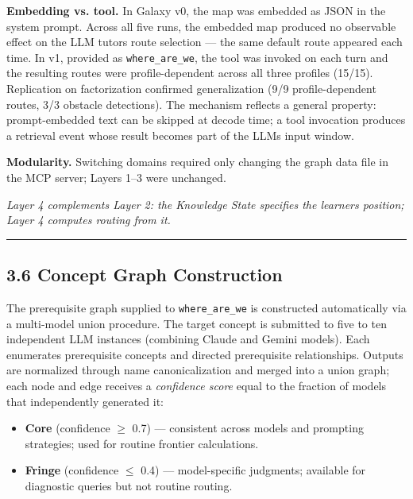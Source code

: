\documentclass[
]{article}
\providecommand{\tightlist}{%
  \setlength{\itemsep}{0pt}\setlength{\parskip}{0pt}}
\begin{document}
\textbf{Embedding vs. tool.} In Galaxy v0, the map was embedded as JSON in the system prompt. Across all five runs, the embedded map produced no observable effect on the LLM tutor\textquotesingle s route selection --- the same default route appeared each time. In v1, provided as \texttt{where\_are\_we}, the tool was invoked on each turn and the resulting routes were profile-dependent across all three profiles (15/15). Replication on factorization confirmed generalization (9/9 profile-dependent routes, 3/3 obstacle detections). The mechanism reflects a general property: prompt-embedded text can be skipped at decode time; a tool invocation produces a retrieval event whose result becomes part of the LLM\textquotesingle s input window.

\textbf{Modularity.} Switching domains required only changing the graph data file in the MCP server; Layers 1--3 were unchanged.

\emph{Layer 4 complements Layer 2: the Knowledge State specifies the learner\textquotesingle s position; Layer 4 computes routing from it.}

\begin{center}\rule{0.5\linewidth}{0.5pt}\end{center}

\subsection{3.6 Concept Graph Construction}\label{36-concept-graph-construction}

The prerequisite graph supplied to \texttt{where\_are\_we} is constructed automatically via a multi-model union procedure. The target concept is submitted to five to ten independent LLM instances (combining Claude and Gemini models). Each enumerates prerequisite concepts and directed prerequisite relationships. Outputs are normalized through name canonicalization and merged into a union graph; each node and edge receives a \emph{confidence score} equal to the fraction of models that independently generated it:

\begin{itemize}
\tightlist
\item
  \textbf{Core} (confidence $\geq$ 0.7) --- consistent across models and prompting strategies; used for routine frontier calculations.
\item
  \textbf{Fringe} (confidence $\leq$ 0.4) --- model-specific judgments; available for diagnostic queries but not routine routing.
\end{itemize}
\end{document}
